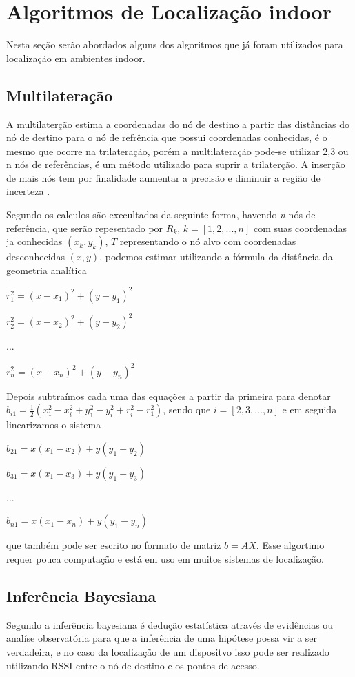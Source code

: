 \section{Algoritmos de Localização indoor}
Nesta seção serão abordados alguns dos algoritmos que já foram utilizados para localização em ambientes indoor.
    \subsection{Multilateração}
    A multilaterção estima a coordenadas do nó de destino a partir das distâncias do nó de destino para o nó de refrência que possui coordenadas conhecidas, é o mesmo que ocorre na trilateração, porém a multilateração pode-se utilizar 2,3 ou n nós de referências, é um método utilizado para suprir a trilaterção. A inserção de mais nós tem por finalidade aumentar a precisão e diminuir a região de incerteza \cite{rfid2009review}.
    \par
    Segundo \citeauthor{rfid2009review} os calculos são execultados da seguinte forma, havendo \textit{n} nós de referência, que serão repesentado por $R_k$,  $k = \left[ 1, 2, ... , n \right] $ com suas coordenadas ja conhecidas $( x_k, y_k )$, $T$ representando o nó alvo com coordenadas desconhecidas $(x,y)$, podemos estimar utilizando a fórmula da distância da geometria analítica
    \par $r_1^2 = (x - x_1 )^2 + (y - y_1)^2$
    \par $r_2^2 = (x - x_2 )^2 + (y - y_2)^2$
    \par ...
    \par $r_n^2 = (x - x_n )^2 + (y - y_n)^2$
    \par 
    Depois subtraímos cada uma das equações a partir da primeira para denotar $b_{i1}= \frac{1}{2}(x_1^2 - x_i^2 + y_1^2 -y_i^2 + r_i^2 - r_1^2)$, sendo que $i = [2,3, ..., n]$ e em seguida linearizamos o sistema
    \par $b_{21} = x(x_1 - x_2) + y(y_1 - y_2)$
    \par $b_{31} = x(x_1 - x_3) + y(y_1 - y_3)$
    \par ...
    \par $b_{n1} = x(x_1 - x_n) + y(y_1 - y_n)$
    \par que também pode ser escrito no formato de matriz $b = AX$. Esse algortimo requer pouca computação e está em uso em muitos sistemas de localização.    

    \subsection{Inferência Bayesiana}
  Segundo \citeauthor{bayesian2001} a inferência bayesiana é dedução estatística através de evidências ou analíse observatória para que a inferência de uma hipótese possa vir a ser verdadeira, e no caso da localização de um dispositvo isso pode ser realizado utilizando RSSI entre o nó de destino e os pontos de acesso.


